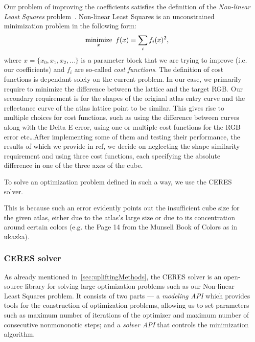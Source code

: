 Our problem of improving the coefficients satisfies the definition of the \emph{Non-linear Least Squares} problem~\cite{nonLinearLeastSquares}. Non-linear Least Squares is an unconstrained minimization problem in the following form:
\begin{equation} \label{eq:nonLinearLeastSquares}
	 \underset{x}{\text{minimize}} \hspace{0.5em} f(x) = \sum_{i} f_{i}(x)^{2},
\end{equation}
where $x= \{x_{0}, x_{1}, x_{2}, ... \}$ is a parameter block that we are trying to improve (i.e. our coefficients) and $f_{i}$ are so-called \emph{cost functions}. The definition of cost functions is dependant solely on the current problem. In our case, we primarily require to minimize the difference between the lattice and the target RGB. Our secondary requirement is for the shapes of the original atlas entry curve and the reflectance curve of the atlas lattice point to be similar. This gives rise to multiple choices for cost functions, such as using the difference between curves along with the Delta E error, using one or multiple cost functions for the RGB error etc\ldots After implementing some of them and testing their performance, the results of which we provide in ref, we decide on neglecting the shape similarity requirement and using three cost functions, each specifying the absolute difference in one of the three axes of the cube.

To solve an optimization problem defined in such a way, we use the CERES solver.


 This is because such an error evidently points out the insufficient cube size for the given atlas, either due to the atlas's large size or due to its concentration around certain colors (e.g. the Page 14 from the Munsell Book of Colors as in ukazka).


\subsubsection{CERES solver} \label{ssec:ceresSolver}

As already mentioned in~\cref{sec:upliftingMethods}, the CERES solver is an open-source library for solving large optimization problems such as our Non-linear Least Squares problem. It consists of two parts --- a \emph{modeling API} which provides tools for the construction of optimization problems, allowing us to set parameters such as maximum number of iterations of the optimizer and maximum number of consecutive nonmononotic steps; and a \emph{solver API} that controls the minimization algorithm.

